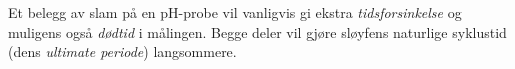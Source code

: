 





Et belegg av slam på en pH-probe vil vanligvis gi ekstra {\it tidsforsinkelse} og muligens også {\it dødtid} i målingen. Begge deler vil gjøre sløyfens naturlige syklustid (dens {\it ultimate periode}) langsommere.










